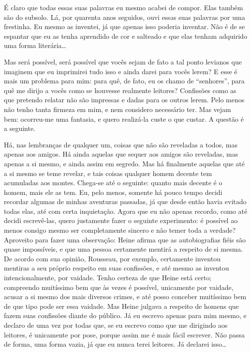 É claro que todas essas suas palavras eu mesmo acabei de compor. Elas
também são do subsolo. Lá, por quarenta anos seguidos, ouvi essas suas
palavras por uma frestinha. Eu mesmo as inventei, já que apenas isso
poderia inventar. Não é de se espantar que eu as tenha aprendido de cor e salteado 
e que elas tenham adquirido uma forma literária\ldots{}

Mas será possível, será possível que vocês sejam de fato a tal ponto
levianos que imaginem que eu imprimirei tudo isso e ainda darei para
vocês lerem? E esse é mais um problema para mim: para quê, de fato, eu
os chamo de “senhores”, para quê me dirijo a vocês como se houvesse
realmente leitores? Confissões como as que pretendo relatar não são
impressas e dadas para os outros lerem. Pelo menos não tenho tanta
firmeza em mim, e nem considero necessário ter. Mas vejam bem:
ocorreu-me uma fantasia, e quero realizá-la custe o que custar. A
questão é a seguinte.

Há, nas lembranças de qualquer um, coisas que não são reveladas a todos,
mas apenas aos amigos. Há ainda aquelas que sequer aos amigos são
reveladas, mas apenas a si mesmo, e ainda assim em segredo. Mas há
finalmente aquelas que até a si mesmo se teme revelar, e tais coisas
qualquer homem decente tem acumuladas aos montes. Chega-se até o
seguinte: quanto mais decente é o homem, mais ele as tem. Eu, pelo menos,
somente há pouco tempo decidi recordar algumas de minhas aventuras
passadas, já que desde então havia evitado todas elas, até com certa
inquietação. Agora que eu não apenas recordo, como até decidi
escrevê-las, quero justamente fazer o seguinte experimento: é possível
ao menos consigo mesmo ser completamente sincero e não temer toda a
verdade? Aproveito para fazer uma observação: Heine afirma que as
autobiografias fiéis são quase impossíveis, e que uma pessoa certamente
mentirá a respeito de si mesma. De acordo com sua opinião, Rousseau,
por exemplo, certamente inventou mentiras a seu próprio respeito em
suas confissões, e até mesmo as inventou intencionalmente, por
vaidade. Tenho certeza de que Heine está certo; compreendo muitíssimo
bem que às vezes é possível, unicamente por vaidade, acusar a si mesmo
dos mais diversos crimes, e até posso conceber muitíssimo bem de que
tipo pode ser essa vaidade. Mas Heine julgava a respeito de homens que
fazem suas confissões diante do público. Já eu escrevo apenas para mim
mesmo, e declaro de uma vez por todas que, se eu escrevo como que me
dirigindo aos leitores, é unicamente por pose, porque assim me é mais
fácil escrever. Não passa de forma, uma forma vazia, já que eu nunca
terei leitores. Já declarei isso\ldots{}

